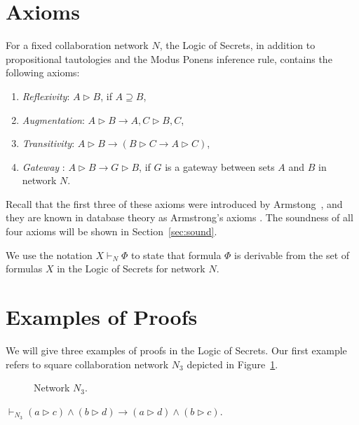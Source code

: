 \documentclass{llncs}
\newcommand{\gateway}{Gateway }
\begin{document}
\section{Axioms}

For a fixed collaboration network $N$, the Logic of Secrets, in addition to propositional tautologies and the Modus Ponens inference rule, contains the following axioms:

\begin{enumerate}
\item {\em Reflexivity}: $A\rhd B$, if $A\supseteq B$,
\item {\em Augmentation}: $A\rhd B \rightarrow A,C\rhd B,C$,
\item {\em Transitivity}: $A\rhd B \rightarrow (B\rhd C \rightarrow A\rhd C)$,
\item {\em \gateway}: $A\rhd B\rightarrow G\rhd B$, if $G$ is a gateway between sets $A$ and $B$ in network $N$.
\end{enumerate}
Recall that the first three of these axioms were introduced by Armstong~\cite{a74}, and they are known in database theory as Armstrong's axioms \cite[p.~81]{guw09}. The soundness of all four axioms will be shown in Section~\ref{sec:sound}.

We use the notation $X \vdash_N \Phi$ to state that formula $\Phi$ is derivable from the set of formulas $X$ in the Logic of Secrets for network $N$.


\section{Examples of Proofs}\label{sec:example}
We will give three examples of proofs in the Logic of Secrets. Our first example refers to square collaboration network $N_3$ depicted in Figure~\ref{square_graph}.

\begin{figure}[htbp]
   \centering
   \caption{Network $N_3$.}
   \label{square_graph}
\end{figure}



\begin{proposition}\label{square example theorem}
$\vdash_{N_3} (a\rhd c) \wedge (b\rhd d) \rightarrow (a\rhd d) \wedge (b\rhd c)$.
\end{proposition}
\end{document}
